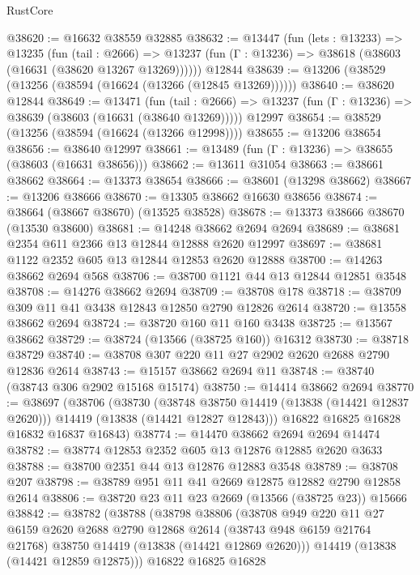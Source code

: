 \begin{lexlean}{RustCore}
\begin{coremodule}
@38620 := @16632 @38559 @32885
@38632 := @13447
    (fun (lets : @13233) =>
    @13235
      (fun (tail : @2666) =>
      @13237 (fun (Γ : @13236) => @38618 (@38603 (@16631 (@38620 @13267 @13269))))))
    @12844
@38639 := @13206 (@38529 (@13256 (@38594 (@16624 (@13266 (@12845 @13269))))))
@38640 := @38620 @12844
@38649 := @13471
    (fun (tail : @2666) => @13237 (fun (Γ : @13236) => @38639 (@38603 (@16631 (@38640 @13269)))))
    @12997
@38654 := @38529 (@13256 (@38594 (@16624 (@13266 @12998))))
@38655 := @13206 @38654
@38656 := @38640 @12997
@38661 := @13489 (fun (Γ : @13236) => @38655 (@38603 (@16631 @38656)))
@38662 := @13611 @31054
@38663 := @38661 @38662
@38664 := @13373 @38654
@38666 := @38601 (@13298 @38662)
@38667 := @13206 @38666
@38670 := @13305 @38662 @16630 @38656
@38674 := @38664 (@38667 @38670) (@13525 @38528)
@38678 := @13373 @38666 @38670 (@13530 @38600)
@38681 := @14248 @38662 @2694 @2694
@38689 := @38681 @2354 @611 @2366 @13 @12844 @12888 @2620 @12997
@38697 := @38681 @1122 @2352 @605 @13 @12844 @12853 @2620 @12888
@38700 := @14263 @38662 @2694 @568
@38706 := @38700 @1121 @44 @13 @12844 @12851 @3548
@38708 := @14276 @38662 @2694
@38709 := @38708 @178
@38718 := @38709 @309 @11 @41 @3438 @12843 @12850 @2790 @12826 @2614
@38720 := @13558 @38662 @2694
@38724 := @38720 @160 @11 @160 @3438
@38725 := @13567 @38662
@38729 := @38724 (@13566 (@38725 @160)) @16312
@38730 := @38718 @38729
@38740 := @38708 @307 @220 @11 @27 @2902 @2620 @2688 @2790 @12836 @2614
@38743 := @15157 @38662 @2694 @11
@38748 := @38740 (@38743 @306 @2902 @15168 @15174)
@38750 := @14414 @38662 @2694
@38770 := @38697
    (@38706
      (@38730
        (@38748 @38750 @14419 (@13838 (@14421 @12837 @2620)))
        @14419
        (@13838 (@14421 @12827 @12843)))
      @16822
      @16825
      @16828
      @16832
      @16837
      @16843)
@38774 := @14470 @38662 @2694 @2694 @14474
@38782 := @38774 @12853 @2352 @605 @13 @12876 @12885 @2620 @3633
@38788 := @38700 @2351 @44 @13 @12876 @12883 @3548
@38789 := @38708 @207
@38798 := @38789 @951 @11 @41 @2669 @12875 @12882 @2790 @12858 @2614
@38806 := @38720 @23 @11 @23 @2669 (@13566 (@38725 @23)) @15666
@38842 := @38782
    (@38788
      (@38798
        @38806
        (@38708
          @949
          @220
          @11
          @27
          @6159
          @2620
          @2688
          @2790
          @12868
          @2614
          (@38743 @948 @6159 @21764 @21768)
          @38750
          @14419
          (@13838 (@14421 @12869 @2620)))
        @14419
        (@13838 (@14421 @12859 @12875)))
      @16822
      @16825
      @16828

\end{coremodule}
\end{lexlean}
